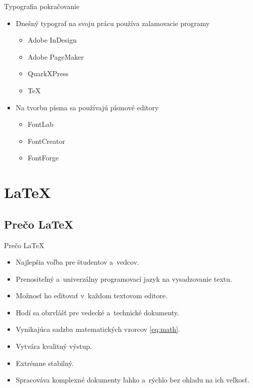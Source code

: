 \documentclass{beamer}
\begin{document}
\begin{frame}{Typografia pokračovanie}

\begin{itemize}
\item Dnešný typograf na svoju prácu používa zalamovacie programy
\begin{itemize}
\item Adobe InDesign
\item Adobe PageMaker
\item QuarkXPress
\item \TeX
\end{itemize}
\item Na tvorbu písma sa používajú písmové editory
\begin{itemize}
\item FontLab
\item FontCreator
\item FontForge
\end{itemize}


\end{itemize}

\end{frame}

\section{\LaTeX}

\subsection{Prečo \LaTeX}

\begin{frame}{Prečo \LaTeX}
\begin{itemize}
\item Najlepšia voľba pre študentov a~vedcov.
\item Prenositeľný a~univerzálny programovací jazyk na vysadzovanie textu.
\item Možnosť ho editovať v~každom textovom editore. 
\item Hodí sa obzvlášť pre vedecké a~technické dokumenty.
\item Vynikajúca sadzba matematických vzorcov \ref{eq:math}.
\item Vytvára kvalitný výstup.
\item Extrémne stabilný.
\item Spracováva komplexné dokumenty ľahko a~rýchlo bez ohladu na ich veľkosť.
\end{itemize}

\end{frame}
\end{document}

